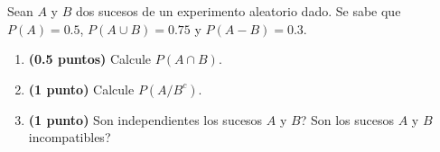 
Sean \(A\) y \(B\) dos sucesos de un experimento aleatorio dado. Se sabe que \(P(A)=0.5\), \(P(A\cup B)=0.75\) y \(P(A-B)=0.3\).
\begin{enumerate}[label=\alph*),leftmargin=2.4em]
  \item \textbf{(0.5 puntos)} Calcule \(P(A\cap B)\).
  \item \textbf{(1 punto)} Calcule \(P(A/B^c)\).
  \item \textbf{(1 punto)} \textquestiondown{}Son independientes los sucesos \(A\) y \(B\)? \textquestiondown{}Son los sucesos \(A\) y \(B\) incompatibles?
\end{enumerate}
